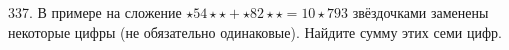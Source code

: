 337. В примере на сложение $\star54\star\star+\star82\star\star=10\star793$ звёздочками заменены некоторые цифры (не обязательно одинаковые). Найдите сумму этих семи цифр.\\

